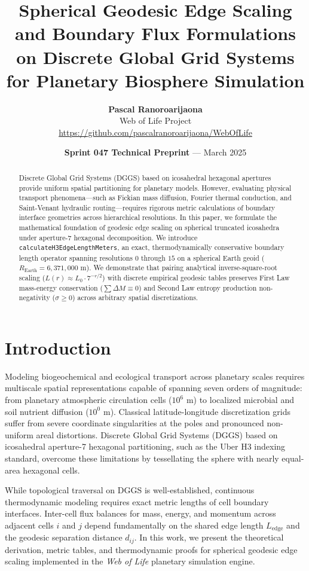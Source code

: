 \documentclass[11pt,a4paper]{article}
\title{\textbf{Spherical Geodesic Edge Scaling and Boundary Flux Formulations on Discrete Global Grid Systems for Planetary Biosphere Simulation}}
\author{
    \textbf{Pascal Ranoroarijaona} \\
    Web of Life Project \\
    \url{https://github.com/pascalranoroarijaona/WebOfLife}
}
\date{\textbf{Sprint 047 Technical Preprint} --- March 2025}
\begin{document}
\maketitle

\begin{abstract}
Discrete Global Grid Systems (DGGS) based on icosahedral hexagonal apertures provide uniform spatial partitioning for planetary models. However, evaluating physical transport phenomena---such as Fickian mass diffusion, Fourier thermal conduction, and Saint-Venant hydraulic routing---requires rigorous metric calculations of boundary interface geometries across hierarchical resolutions. In this paper, we formulate the mathematical foundation of geodesic edge scaling on spherical truncated icosahedra under aperture-7 hexagonal decomposition. We introduce \texttt{calculateH3EdgeLengthMeters}, an exact, thermodynamically conservative boundary length operator spanning resolutions $0$ through $15$ on a spherical Earth geoid ($R_{\text{Earth}} = 6{,}371{,}000\text{ m}$). We demonstrate that pairing analytical inverse-square-root scaling ($L(r) \approx L_0 \cdot 7^{-r/2}$) with discrete empirical geodesic tables preserves First Law mass-energy conservation ($\sum \Delta M \equiv 0$) and Second Law entropy production non-negativity ($\sigma \ge 0$) across arbitrary spatial discretizations.
\end{abstract}

\section{Introduction}
Modeling biogeochemical and ecological transport across planetary scales requires multiscale spatial representations capable of spanning seven orders of magnitude: from planetary atmospheric circulation cells ($10^6\text{ m}$) to localized microbial and soil nutrient diffusion ($10^0\text{ m}$). Classical latitude-longitude discretization grids suffer from severe coordinate singularities at the poles and pronounced non-uniform areal distortions. Discrete Global Grid Systems (DGGS) based on icosahedral aperture-7 hexagonal partitioning, such as the Uber H3 indexing standard, overcome these limitations by tessellating the sphere with nearly equal-area hexagonal cells.

While topological traversal on DGGS is well-established, continuous thermodynamic modeling requires exact metric lengths of cell boundary interfaces. Inter-cell flux balances for mass, energy, and momentum across adjacent cells $i$ and $j$ depend fundamentally on the shared edge length $L_{\text{edge}}$ and the geodesic separation distance $d_{ij}$. In this work, we present the theoretical derivation, metric tables, and thermodynamic proofs for spherical geodesic edge scaling implemented in the \textit{Web of Life} planetary simulation engine.
\end{document}
